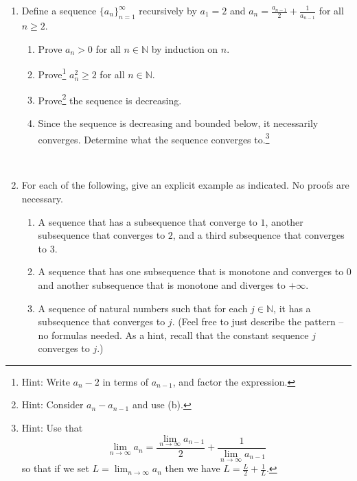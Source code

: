 \documentclass{amsart}
\def\N{\mathbb N}
\begin{document}
\begin{enumerate}


	\item Define a sequence $\{a_n\}_{n=1}^\infty$ recursively by $a_1 = 2$ and $a_n = \frac{a_{n-1}}{2} + \frac{1}{a_{n-1}}$ for all $n \geq 2$. 
	
	\begin{enumerate}
		
		\item Prove $a_n > 0$ for all $n \in \N$ by induction on $n$. 
		
		\item Prove\footnote{Hint: Write $a_n-2$ in terms of $a_{n-1}$, and factor the expression.} $a_n^2 \geq 2$ for all $n \in \N$. 
		
		\item Prove\footnote{Hint: Consider $a_n - a_{n-1}$ and use (b).} the sequence is decreasing.
		
		\item Since the sequence is decreasing and bounded below, it
		necessarily converges. 
		Determine what the sequence converges to.\footnote{Hint: Use that
		$$
		\lim_{n \to \infty} a_n = \frac{\lim_{n \to \infty} a_{n-1}}{2} +
		\frac{1}{\lim_{n \to \infty} a_{n-1}}
		$$
		so that if we set $L = \lim_{n \to \infty} a_n$ then we have $L =
		\frac{L}2 + \frac{1}{L}$.}
		
		\
		
			\end{enumerate}
		
			\item For each of the following, give an explicit example as indicated. No proofs are necessary.
	
	\begin{enumerate}
		
		\item A sequence that has a subsequence that converge to $1$, another subsequence that converges to $2$, and a third subsequence that converges to $3$. 
		
		\item A sequence that has one subsequence that is monotone and converges to $0$ and another subsequence that is monotone and diverges to $+ \infty$.
		
		\item A sequence of natural numbers such that for each $j \in \N$, it has a subsequence that converges to $j$. (Feel free to just describe the pattern -- no formulas needed.
		As a hint, recall that the constant sequence $j$ converges to $j$.)
		

\end{enumerate}
\end{enumerate}
\end{document}
